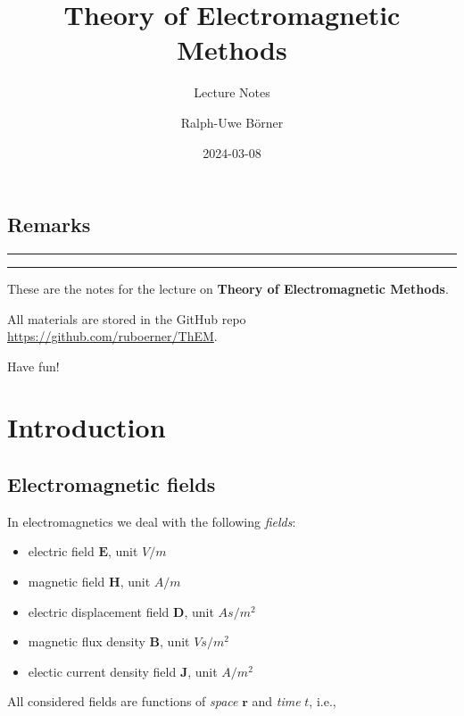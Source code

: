 \documentclass[
  a4paper,
  DIV=11,
  numbers=noendperiod]{scrreprt}
\title{Theory of Electromagnetic Methods}
\subtitle{Lecture Notes}
\author{Ralph-Uwe Börner}
\date{2024-03-08}
\providecommand{\tightlist}{%
  \setlength{\itemsep}{0pt}\setlength{\parskip}{0pt}}\usepackage{longtable,booktabs,array}
\renewcommand*\contentsname{Table of contents}
\newcommand\contentsname{Table of contents}
\begin{document}
\maketitle

\renewcommand*\contentsname{Table of contents}
{
\hypersetup{linkcolor=}
\setcounter{tocdepth}{2}
\tableofcontents
}

\chapter{Remarks}\label{remarks}

\begin{center}\rule{0.5\linewidth}{0.5pt}\end{center}

\begin{center}\rule{0.5\linewidth}{0.5pt}\end{center}

These are the notes for the lecture on \textbf{Theory of Electromagnetic
Methods}.

All materials are stored in the GitHub repo
\url{https://github.com/ruboerner/ThEM}.

Have fun!

\part{Introduction}

\chapter{Electromagnetic fields}\label{electromagnetic-fields}

In electromagnetics we deal with the following \emph{fields}:

\begin{itemize}
\tightlist
\item
  electric field \(\mathbf E\), unit \(V / m\)
\item
  magnetic field \(\mathbf H\), unit \(A / m\)
\item
  electric displacement field \(\mathbf D\), unit \(As / m^2\)
\item
  magnetic flux density \(\mathbf B\), unit \(Vs / m^2\)
\item
  electic current density field \(\mathbf J\), unit \(A / m^2\)
\end{itemize}

All considered fields are functions of \emph{space} \(\mathbf r\) and
\emph{time} \(t\), i.e.,
\end{document}
